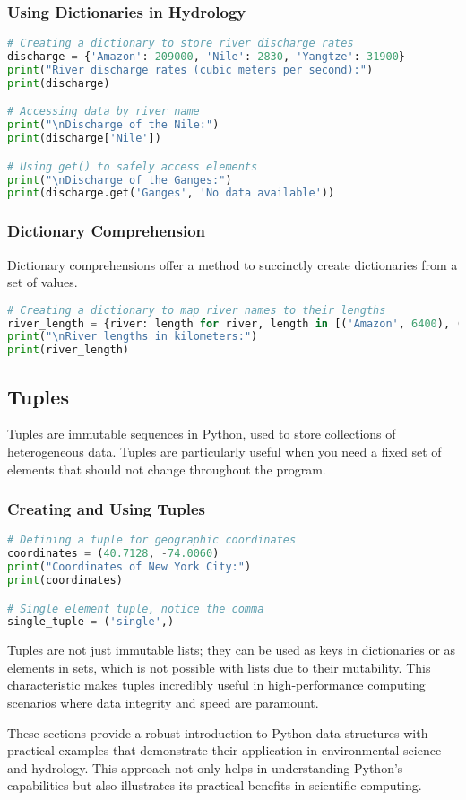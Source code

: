 \subsubsection{Using Dictionaries in Hydrology}
\begin{lstlisting}[language=Python]
# Creating a dictionary to store river discharge rates
discharge = {'Amazon': 209000, 'Nile': 2830, 'Yangtze': 31900}
print("River discharge rates (cubic meters per second):")
print(discharge)

# Accessing data by river name
print("\nDischarge of the Nile:")
print(discharge['Nile'])

# Using get() to safely access elements
print("\nDischarge of the Ganges:")
print(discharge.get('Ganges', 'No data available'))
\end{lstlisting}

\subsubsection{Dictionary Comprehension}
Dictionary comprehensions offer a method to succinctly create dictionaries from a set of values.

\begin{lstlisting}[language=Python]
# Creating a dictionary to map river names to their lengths
river_length = {river: length for river, length in [('Amazon', 6400), ('Nile', 6650)]}
print("\nRiver lengths in kilometers:")
print(river_length)
\end{lstlisting}

\subsection{Tuples}
Tuples are immutable sequences in Python, used to store collections of heterogeneous data. Tuples are particularly useful when you need a fixed set of elements that should not change throughout the program.

\subsubsection{Creating and Using Tuples}
\begin{lstlisting}[language=Python]
# Defining a tuple for geographic coordinates
coordinates = (40.7128, -74.0060)
print("Coordinates of New York City:")
print(coordinates)

# Single element tuple, notice the comma
single_tuple = ('single',)
\end{lstlisting}

Tuples are not just immutable lists; they can be used as keys in dictionaries or as elements in sets, which is not possible with lists due to their mutability. This characteristic makes tuples incredibly useful in high-performance computing scenarios where data integrity and speed are paramount.

These sections provide a robust introduction to Python data structures with practical examples that demonstrate their application in environmental science and hydrology. This approach not only helps in understanding Python's capabilities but also illustrates its practical benefits in scientific computing.


